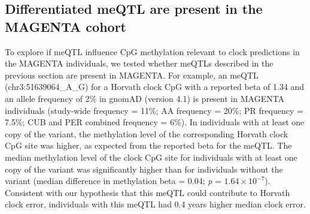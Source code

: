 

\subsection{Differentiated meQTL are present in the MAGENTA cohort}
To explore if meQTL influence CpG methylation relevant to clock predictions in the MAGENTA individuals, we tested whether meQTLs described in the previous section are present in MAGENTA. For example, an meQTL (chr3:51639064\_A\_G) for a Horvath clock CpG with a reported beta of 1.34 and an allele frequency of 2\% in gnomAD (version 4.1) is present in MAGENTA individuals (study-wide frequency = 11\%; AA frequency = 20\%; PR frequency = 7.5\%; CUB and PER combined frequency = 6\%). In individuals with at least one copy of the variant, the methylation level of the corresponding Horvath clock CpG site was higher, as expected from the reported beta for the meQTL. The median methylation level of the clock CpG site for individuals with at least one copy of the variant was significantly higher than for individuals without the variant (median difference in methylation beta = 0.04; \textit{p} = $1.64 \times 10^{-7}$). Consistent with our hypothesis that this meQTL could contribute to Horvath clock error, individuals with this meQTL had 0.4 years higher median clock error. 

